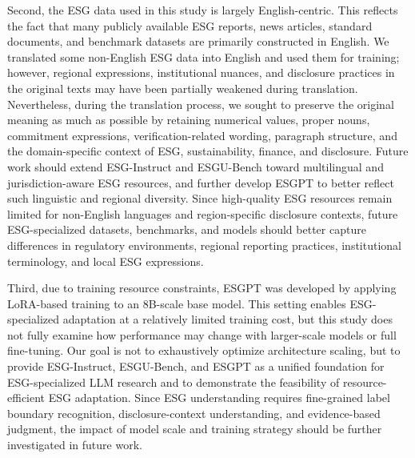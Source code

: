 \documentclass[11pt]{article}
\begin{document}
Second, the ESG data used in this study is largely English-centric. 
This reflects the fact that many publicly available ESG reports, news articles, standard documents, and benchmark datasets are primarily constructed in English. 
We translated some non-English ESG data into English and used them for training; however, regional expressions, institutional nuances, and disclosure practices in the original texts may have been partially weakened during translation. 
Nevertheless, during the translation process, we sought to preserve the original meaning as much as possible by retaining numerical values, proper nouns, commitment expressions, verification-related wording, paragraph structure, and the domain-specific context of ESG, sustainability, finance, and disclosure. Future work should extend \textsf{ESG-Instruct} and \textsf{ESGU-Bench} toward multilingual and jurisdiction-aware ESG resources, and further develop \textsf{ESGPT} to better reflect such linguistic and regional diversity. Since high-quality ESG resources remain limited for non-English languages and region-specific disclosure contexts, future ESG-specialized datasets, benchmarks, and models should better capture differences in regulatory environments, regional reporting practices, institutional terminology, and local ESG expressions.

Third, due to training resource constraints, \textsf{ESGPT} was developed by applying LoRA-based training to an 8B-scale base model. 
This setting enables ESG-specialized adaptation at a relatively limited training cost, but this study does not fully examine how performance may change with larger-scale models or full fine-tuning.
Our goal is not to exhaustively optimize architecture scaling, but to provide \textsf{ESG-Instruct}, \textsf{ESGU-Bench}, and \textsf{ESGPT} as a unified foundation for ESG-specialized LLM research and to demonstrate the feasibility of resource-efficient ESG adaptation.
Since ESG understanding requires fine-grained label boundary recognition, disclosure-context understanding, and evidence-based judgment, the impact of model scale and training strategy should be further investigated in future work.
\end{document}
